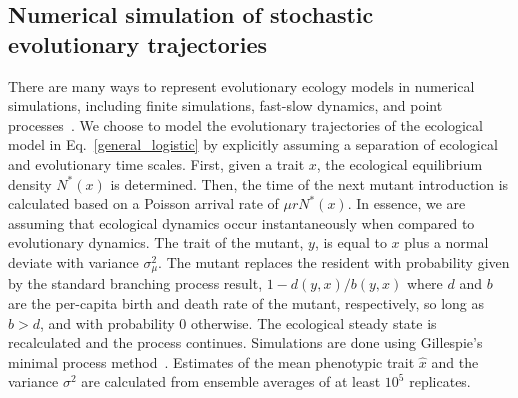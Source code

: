 \subsection{Numerical simulation of stochastic evolutionary trajectories}
There are many ways to represent evolutionary ecology models in numerical simulations, including finite simulations, fast-slow dynamics, and point processes~\citep{dieckmann_nat1999,nowak_science2004,champagnat2006,champagnat_2007}.  We choose to model the evolutionary trajectories of the ecological model in Eq.~\eqref{general_logistic} by explicitly assuming a separation of ecological and evolutionary time scales.  First, given a trait $x$, the ecological equilibrium density $N^{\ast}(x)$ is determined.  Then, the time of the next mutant introduction is calculated based on a Poisson arrival rate of $\mu r N^{\ast}(x)$.  In essence, we are assuming that ecological dynamics occur instantaneously when compared to evolutionary dynamics.  The trait of the mutant, $y$, is equal to $x$ plus a normal deviate with variance $\sigma_{\mu}^2$.  
The mutant replaces the resident with probability given by the standard branching process result, $1-d(y,x)/b(y,x)$ where $d$ and $b$ are the per-capita birth and death rate of the 
mutant, respectively, so long as $b>d$, and with probability 0 otherwise.  
The ecological steady state is recalculated and the process continues.  
Simulations are done using Gillespie's minimal process method~\citep{Gillespie}.
Estimates of the mean phenotypic trait $\hat x$ and the variance $\sigma^2$ are calculated from ensemble averages of at least $10^5$ replicates. 
 
